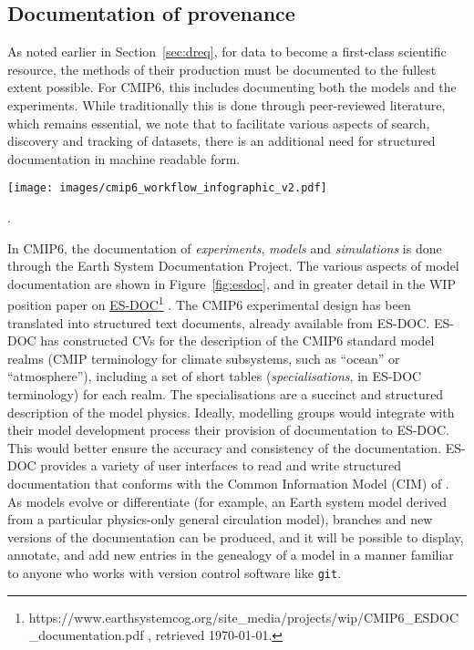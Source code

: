 \documentclass[gmd,manuscript]{copernicus}
\begin{document}
\subsection{Documentation of provenance}
\label{sec:doc}

As noted earlier in Section~\ref{sec:dreq}, for data to become a
first-class scientific resource, the methods of their production must
be documented to the fullest extent possible. For CMIP6, this includes
documenting both the models and the experiments. While traditionally
this is done through peer-reviewed literature, which remains
essential, we note that to facilitate various aspects of search,
discovery and tracking of datasets, there is an additional need for
structured documentation in machine readable form.

\begin{figure*}
  \begin{center}
    \texttt{[image: images/cmip6\_workflow\_infographic\_v2.pdf]}
  \end{center}
  \caption{Elements of ES-DOC documentation. Rows indicate phases of
    the modelling process being documented, and box colors indicate the
    parties responsible for producing the documentation (see legend).
    Figure courtesy Guillaume Levavasseur, IPSL}.
  \label{fig:esdoc}
\end{figure*}

In CMIP6, the documentation of \emph{experiments}, \emph{models} and
\emph{simulations} is done through the Earth System Documentation
\citep[\href{https://www.earthsystemcog.org/projects/es-doc-models/
}{ES-DOC}\footnote{https://www.earthsystemcog.org/projects/es-doc-models/
  , retrieved \today.} ,][]{ref:guilyardietal2013} Project. The
various aspects of model documentation are shown in
Figure~\ref{fig:esdoc}, and in greater detail in the WIP position
paper on
\href{https://www.earthsystemcog.org/site_media/projects/wip/CMIP6_ESDOC_documentation.pdf
}{ES-DOC}\footnote{https://www.earthsystemcog.org/site\_media/projects/wip/CMIP6\_ESDOC\_documentation.pdf
  , retrieved \today.} . The CMIP6 experimental design has been
translated into structured text documents, already available from
ES-DOC. ES-DOC has constructed CVs for the description of the CMIP6
standard model realms (CMIP terminology for climate subsystems, such
as ``ocean'' or ``atmosphere''), including a set of short tables
(\emph{specialisations}, in ES-DOC terminology) for each realm. The
specialisations are a succinct and structured description of the model
physics. Ideally, modelling groups would integrate with their model
development process their provision of documentation to ES-DOC. This
would better ensure the accuracy and consistency of the documentation.
ES-DOC provides a variety of user interfaces to read and write
structured documentation that conforms with the Common Information
Model (CIM) of \cite{ref:lawrenceetal2012}. As models evolve or
differentiate (for example, an Earth system model derived from a
particular physics-only general circulation model), branches and new
versions of the documentation can be produced, and it will be possible
to display, annotate, and add new entries in the genealogy of a model
in a manner familiar to anyone who works with version control software
like \texttt{git}.
\end{document}
